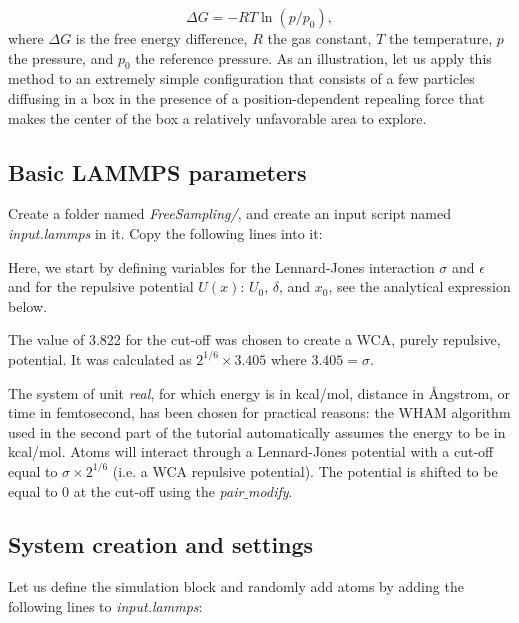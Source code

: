 $$\Delta G = -RT \ln(p/p_0),$$
where $\Delta G$ is the free energy difference,
$R$ the gas constant,
$T$ the temperature, 
$p$ the pressure,
and $p_0$ the reference pressure.
As an illustration, let us apply this method to an
extremely simple configuration that consists of a few
particles diffusing in a box in the presence of a position-dependent
repealing force that makes the center
of the box a relatively unfavorable area to explore.

\subsection{Basic LAMMPS parameters}
\noindent Create a folder named \textit{FreeSampling/}, and create an input script
named \textit{input.lammps} in it. Copy the following lines into it:


\noindent Here, we start by defining variables for the Lennard-Jones
interaction $\sigma$ and $\epsilon$ and for
the repulsive potential $U (x)$: $U_0$, $\delta$, and $x_0$, 
see the analytical expression below.

\vspace{0.25cm} \noindent The value of 3.822 for the cut-off was chosen to 
create a WCA, purely repulsive, potential. It was calculated
as $2^{1/6} $ where
$3.405 = \sigma$.

\vspace{0.25cm} \noindent The system of unit \textit{real}, for which energy is in kcal/mol, distance in Ångstrom,
or time in femtosecond, has been chosen for practical reasons:
the WHAM algorithm used in the second
part of the tutorial automatically assumes the energy to
be in kcal/mol. Atoms will interact through a
Lennard-Jones potential with a cut-off equal to 
$\sigma {} ^ {1/6}$ (i.e. a WCA repulsive
potential). The potential is shifted to be equal to 0 at
the cut-off using the \textit{pair$\_$modify}.

\subsection{System creation and settings}
\noindent Let us define the simulation block and randomly add atoms
by adding the following lines to \textit{input.lammps}:

